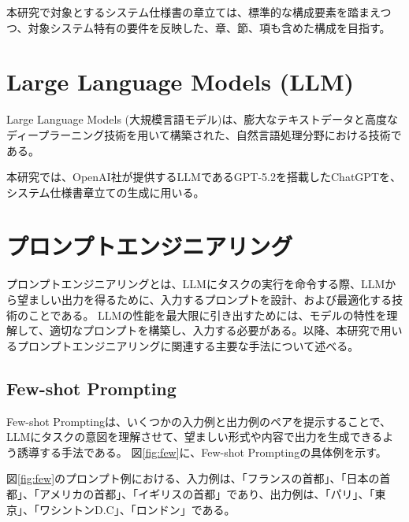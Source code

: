 

本研究で対象とするシステム仕様書の章立ては、標準的な構成要素を踏まえつつ、対象システム特有の要件を反映した、章、節、項も含めた構成を目指す。


\section{Large Language Models (LLM)}
\label{sec:llm}

Large Language Models (大規模言語モデル)\cite{whatllm}は、膨大なテキストデータと高度なディープラーニング技術を用いて構築された、自然言語処理分野における技術である。

本研究では、OpenAI\cite{openai}社が提供するLLMであるGPT-5.2\cite{gpt52}を搭載したChatGPT\cite{chatgpt}を、システム仕様書章立ての生成に用いる。

\section{プロンプトエンジニアリング}
\label{sec:prompt_engineering}

プロンプトエンジニアリングとは、LLMにタスクの実行を命令する際、LLMから望ましい出力を得るために、入力するプロンプトを設計、および最適化する技術のことである\cite{prompt_engineering}。
LLMの性能を最大限に引き出すためには、モデルの特性を理解して、適切なプロンプトを構築し、入力する必要がある。以降、本研究で用いるプロンプトエンジニアリングに関連する主要な手法について述べる。

\subsection{Few-shot Prompting}
\label{subsec:few_shot}

Few-shot Prompting\cite{fewshot}は、いくつかの入力例と出力例のペアを提示することで、LLMにタスクの意図を理解させて、望ましい形式や内容で出力を生成できるよう誘導する手法である。
図\ref{fig:few}に、Few-shot Promptingの具体例を示す。

図\ref{fig:few}のプロンプト例における、入力例は、「フランスの首都」、「日本の首都」、「アメリカの首都」、「イギリスの首都」であり、出力例は、「パリ」、「東京」、「ワシントンD.C」、「ロンドン」である。

